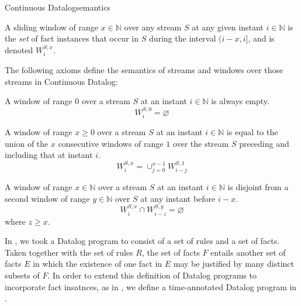 \begin{nestedsection}{Continuous Datalog}{semantics}
\begin{definition}
A sliding window of range ${x \in \mathbb{N}}$ over any stream $S$ at
any given instant ${i \in \mathbb{N}}$ is the \emph{set} of fact
instances that occur in $S$ during the interval ${(i-x,i]}$, and is
denoted ${W^{S,x}_{i}}$.
\end{definition}

The following axioms define the semantics of streams and windows over
those streams in Continuous Datalog:

\begin{axiom}\label{axiom:continuous datalog: window range leq 0}
A window of range $0$ over a stream $S$ at an instant 
${i \in \mathbb{N}}$ is always empty.
\begin{equation*}
W^{S,0}_{i} = \varnothing
\end{equation*}
\end{axiom}

\begin{axiom}\label{axiom:continuous datalog: window composition}
A window of range ${x \ge 0}$ over a stream $S$ at an instant 
${i \in \mathbb{N}}$ is equal to the union of the $x$ consecutive
windows of range $1$ over the stream $S$ preceding and including that at
instant $i$.
\begin{equation*}
W^{S,x}_{i} = \mathop{\cup}_{j=0}^{x-1} W^{S,1}_{i-j}
\end{equation*}
\end{axiom}

\begin{axiom}\label{axiom:continuous datalog: window disjointness}
A window of range ${x \in \mathbb{N}}$ over a stream $S$ at an
instant ${i \in \mathbb{N}}$ is disjoint from a second window of 
range ${y \in \mathbb{N}}$ over $S$ at any instant before $i - x$.
\begin{equation*}
W^{S,x}_{i} \cap W^{S,y}_{i-z} = \varnothing
\end{equation*}
where $z \geq x$.
\end{axiom}

In , we took a
Datalog program to consist of a set of rules and a set of facts.
Taken together with the set of rules $R$, the set of facts $F$ entails
another set of facts $E$ in which the existence of one fact in $E$ may
be justified by many distinct subsets of $F$. In order to extend this
definition of Datalog programs to incorporate fact insatnces,
as in , we define a
time-annotated Datalog program in .


\end{nestedsection}
